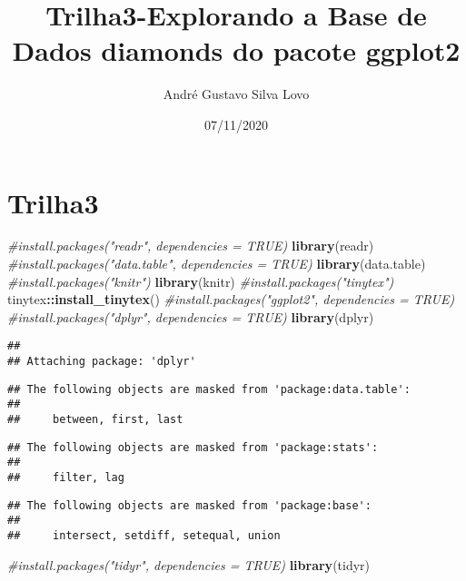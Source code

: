 \documentclass[
]{article}
\title{Trilha3-Explorando a Base de Dados diamonds do pacote ggplot2}
\author{André Gustavo Silva Lovo}
\date{07/11/2020}
\newenvironment{Shaded}{\begin{snugshade}}{\end{snugshade}}
\newcommand{\CommentTok}[1]{\textcolor[rgb]{0.56,0.35,0.01}{\textit{#1}}}
\newcommand{\KeywordTok}[1]{\textcolor[rgb]{0.13,0.29,0.53}{\textbf{#1}}}
\newcommand{\NormalTok}[1]{#1}
\newcommand{\OperatorTok}[1]{\textcolor[rgb]{0.81,0.36,0.00}{\textbf{#1}}}
\begin{document}
\maketitle

\hypertarget{trilha3}{%
\section{Trilha3}\label{trilha3}}

\begin{Shaded}
\begin{Highlighting}[]
\CommentTok{#install.packages("readr", dependencies = TRUE)}
\KeywordTok{library}\NormalTok{(readr) }
\CommentTok{#install.packages("data.table", dependencies = TRUE)}
\KeywordTok{library}\NormalTok{(data.table)}
\CommentTok{#install.packages("knitr")}
\KeywordTok{library}\NormalTok{(knitr)}
\CommentTok{#install.packages("tinytex")}
\NormalTok{tinytex}\OperatorTok{::}\KeywordTok{install_tinytex}\NormalTok{()}
\CommentTok{#install.packages("ggplot2", dependencies = TRUE)}
\CommentTok{#install.packages("dplyr", dependencies = TRUE)}
\KeywordTok{library}\NormalTok{(dplyr) }
\end{Highlighting}
\end{Shaded}

\begin{verbatim}
## 
## Attaching package: 'dplyr'
\end{verbatim}

\begin{verbatim}
## The following objects are masked from 'package:data.table':
## 
##     between, first, last
\end{verbatim}

\begin{verbatim}
## The following objects are masked from 'package:stats':
## 
##     filter, lag
\end{verbatim}

\begin{verbatim}
## The following objects are masked from 'package:base':
## 
##     intersect, setdiff, setequal, union
\end{verbatim}

\begin{Shaded}
\begin{Highlighting}[]
\CommentTok{#install.packages("tidyr", dependencies = TRUE)}
\KeywordTok{library}\NormalTok{(tidyr)}
\end{Highlighting}
\end{Shaded}
\end{document}
